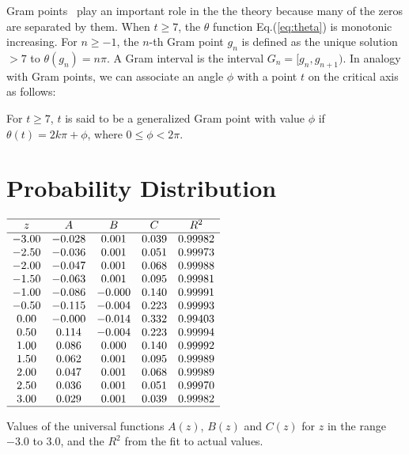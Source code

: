 \documentclass[twoside]{article}
\begin{document}
Gram points~\cite{Gram 1903} play an important role in the the theory because many of the zeros are separated by them.  When $t \ge 7$, the $\theta$ function Eq.(\ref{eq:theta}) is monotonic increasing. 
For $n \ge -1$, the $n$-th Gram point $g_n$ is defined as the unique solution $> 7$ to
$\theta (g_n) = n\pi$. A Gram interval is the interval $G_n = [g_n,g_{n+1})$.
 In analogy with Gram points, we can associate an angle $\phi$ with a point $t$ on the critical axis as follows:
\begin{definition}\label{phi}
For $t \ge 7$, $t$ is said to be a generalized Gram point with value $\phi$  if
$\theta (t) = 2k\pi + \phi$, where $0 \le \phi < 2\pi$.
\end{definition}



\section{\label{sec3}Probability Distribution}

\begin{table}
\centering \(\begin{array}{ccccccc}
\hline
     z     & A   &      B      &   C    &R^2\\
\hline
-3.00& -0.028&  0.001&  0.039& 0.99982\\
  -2.50& -0.036&  0.001&  0.051& 0.99973\\
  -2.00& -0.047&  0.001&  0.068& 0.99988\\
  -1.50& -0.063&  0.001&  0.095& 0.99981\\
  -1.00& -0.086& -0.000&  0.140& 0.99991\\
  -0.50& -0.115& -0.004&  0.223& 0.99993\\
   0.00& -0.000& -0.014&  0.332& 0.99403\\
   0.50&  0.114& -0.004&  0.223& 0.99994\\
   1.00&  0.086&  0.000&  0.140& 0.99992\\
   1.50&  0.062&  0.001&  0.095& 0.99989\\
   2.00&  0.047&  0.001&  0.068& 0.99989\\
   2.50&  0.036&  0.001&  0.051& 0.99970\\
   3.00&  0.029&  0.001&  0.039& 0.99982\\
\hline
\end{array}\)
\caption{Values of the universal functions $A(z)$, $B(z)$ and $C(z)$ 
for $z$ in the range $-3.0$ to $3.0$, and the $R^2$ from the fit to actual values.} 
\label{tab:coefficients}
\end{table}
\end{document}
